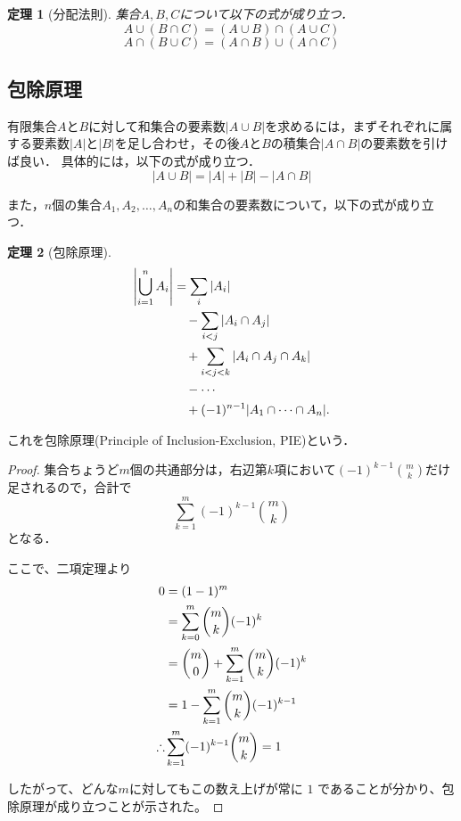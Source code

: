 \documentclass[11pt]{jsreport}
\theoremstyle{plain} %
\newtheorem{theorem}{定理}
\theoremstyle{definition}
\begin{document}
\begin{theorem}[分配法則] 集合$A, B, C$について以下の式が成り立つ．
    \begin{equation}
        A \cup (B \cap C) = (A \cup B) \cap (A \cup C)
    \end{equation}
    \begin{equation}
        A \cap (B \cup C) = (A \cap B) \cup (A \cap C)
    \end{equation}
\end{theorem}

\subsection{包除原理}
有限集合$A$と$B$に対して和集合の要素数$|A \cup B|$を求めるには，まずそれぞれに属する要素数$|A|$と$|B|$を足し合わせ，その後$A$と$B$の積集合$|A \cap B|$の要素数を引けば良い．
具体的には，以下の式が成り立つ．
\begin{equation}
    |A \cup B| = |A| + |B| - |A \cap B|
\end{equation}

また，$n$個の集合$A_1, A_2, \ldots, A_n$の和集合の要素数について，以下の式が成り立つ．
\begin{theorem}[包除原理]
        \begin{align}
        \left| \bigcup_{i=1}^{n} A_i \right|
        &= \sum_i |A_i| \notag \\
        &\quad - \sum_{i < j} |A_i \cap A_j| \notag \\
        &\quad + \sum_{i < j < k} |A_i \cap A_j \cap A_k| \notag \\
        &\quad - \cdots \notag \\
        &\quad + (-1)^{n-1} |A_1 \cap \cdots \cap A_n|.
        \end{align}
\end{theorem}

これを包除原理(Principle of Inclusion-Exclusion, PIE)という．

\begin{proof}
集合ちょうど$m$個の共通部分は，右辺第$k$項において$(-1)^{k-1}\binom{m}{k}$だけ足されるので，合計で
\[
\sum_{k=1}^m (-1)^{k-1} \binom{m}{k}
\]
となる．

ここで、二項定理より
\begin{align}
    0 &= (1 - 1)^m  \notag \\
    &= \sum_{k=0}^m \binom{m}{k} (-1)^k  \notag \\
    &= \binom{m}{0} + \sum_{k=1}^m \binom{m}{k} (-1)^k  \notag \\
    &= 1 - \sum_{k=1}^m \binom{m}{k} (-1)^{k-1} \notag \\
    \therefore &\sum_{k=1}^m (-1)^{k-1} \binom{m}{k} = 1\notag
\end{align}

したがって、どんな$m$に対してもこの数え上げが常に $1$ であることが分かり、包除原理が成り立つことが示された。
\end{proof}
\end{document}
